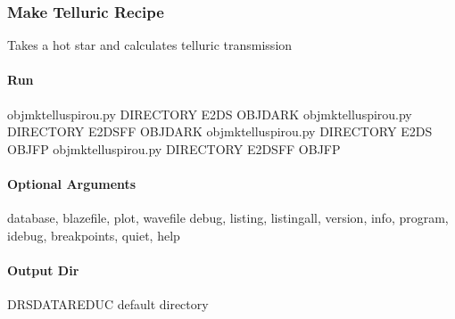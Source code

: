 \documentclass[a4paper,10pt,english]{report}
\begin{document}
\subsubsection{Make Telluric Recipe}
\label{\detokenize{user/spirou/recipes/make_tellu:make-telluric-recipe}}\label{\detokenize{user/spirou/recipes/make_tellu:recipes-spirou-mk-tellu}}\label{\detokenize{user/spirou/recipes/make_tellu::doc}}
Takes a hot star and calculates telluric transmission


\paragraph{Run}
\label{\detokenize{user/spirou/recipes/make_tellu:run}}
\begin{sphinxVerbatim}[commandchars=\\\{\}]
obj\PYGZus{}mk\PYGZus{}tellu\PYGZus{}spirou.py \PYG{o}{[}DIRECTORY\PYG{o}{]} \PYG{o}{[}E2DS  OBJ\PYGZus{}DARK\PYG{o}{]}
obj\PYGZus{}mk\PYGZus{}tellu\PYGZus{}spirou.py \PYG{o}{[}DIRECTORY\PYG{o}{]} \PYG{o}{[}E2DSFF  OBJ\PYGZus{}DARK\PYG{o}{]}
obj\PYGZus{}mk\PYGZus{}tellu\PYGZus{}spirou.py \PYG{o}{[}DIRECTORY\PYG{o}{]} \PYG{o}{[}E2DS  OBJ\PYGZus{}FP\PYG{o}{]}
obj\PYGZus{}mk\PYGZus{}tellu\PYGZus{}spirou.py \PYG{o}{[}DIRECTORY\PYG{o}{]} \PYG{o}{[}E2DSFF  OBJ\PYGZus{}FP\PYG{o}{]}
\end{sphinxVerbatim}


\paragraph{Optional Arguments}
\label{\detokenize{user/spirou/recipes/make_tellu:optional-arguments}}
\begin{sphinxVerbatim}[commandchars=\\\{\}]
\PYGZhy{}\PYGZhy{}database, \PYGZhy{}\PYGZhy{}blazefile, \PYGZhy{}\PYGZhy{}plot, \PYGZhy{}\PYGZhy{}wavefile
\PYGZhy{}\PYGZhy{}debug, \PYGZhy{}\PYGZhy{}listing, \PYGZhy{}\PYGZhy{}listingall, \PYGZhy{}\PYGZhy{}version, \PYGZhy{}\PYGZhy{}info,
\PYGZhy{}\PYGZhy{}program, \PYGZhy{}\PYGZhy{}idebug, \PYGZhy{}\PYGZhy{}breakpoints, \PYGZhy{}\PYGZhy{}quiet, \PYGZhy{}\PYGZhy{}help
\end{sphinxVerbatim}


\paragraph{Output Dir}
\label{\detokenize{user/spirou/recipes/make_tellu:output-dir}}
\begin{sphinxVerbatim}[commandchars=\\\{\}]
DRS\PYGZus{}DATA\PYGZus{}REDUC    default  directory
\end{sphinxVerbatim}
\end{document}
